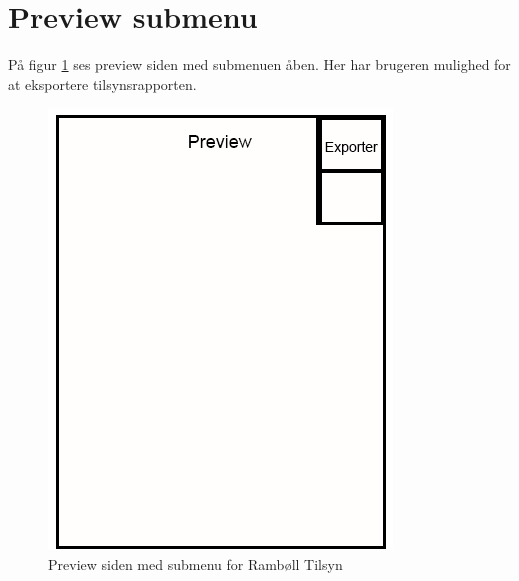 \section{Preview submenu}\label{sec:PreviewSubMock}
På figur \ref{fig:PreviewSubMock} ses preview siden med submenuen åben. Her har brugeren mulighed for at eksportere tilsynsrapporten.

\begin{figure}[H]
	\centering
	\includegraphics[width=0.4\linewidth]{MockUps/Mock/Ramboell-Preview-Sub}
	\caption{Preview siden med submenu for Rambøll Tilsyn}
	\label{fig:PreviewSubMock}
\end{figure}
